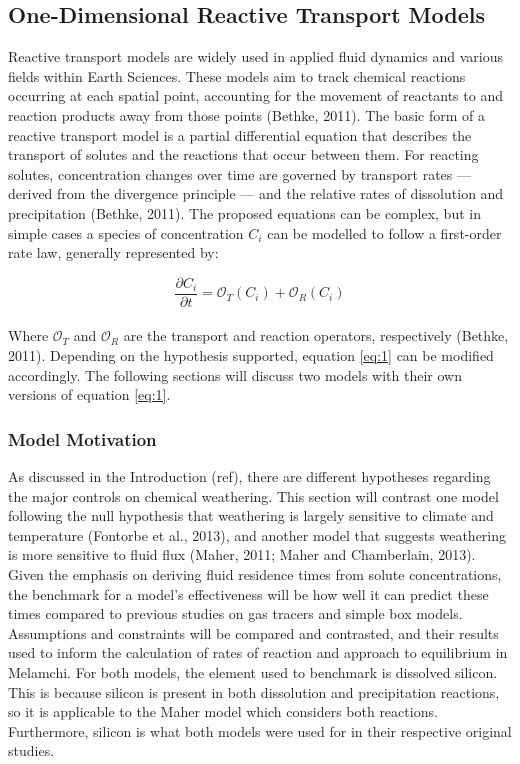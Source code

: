 \subsection{One-Dimensional Reactive Transport Models}

Reactive transport models are widely used in applied fluid dynamics and various fields within Earth Sciences. These models aim to track chemical reactions occurring at each spatial point, accounting for the movement of reactants to and reaction products away from those points (Bethke, 2011). The basic form of a reactive transport model is a partial differential equation that describes the transport of solutes and the reactions that occur between them. For reacting solutes, concentration changes over time are governed by transport rates — derived from the divergence principle — and the relative rates of dissolution and precipitation (Bethke, 2011). The proposed equations can be complex, but in simple cases a species of concentration $C_i$ can be modelled to follow a first-order rate law, generally represented by:

\begin{equation}
    \frac{\partial C_i}{\partial t} = \mathcal{O}_{T}(C_i) + \mathcal{O}_{R}(C_i)
    \label{eq:1}
\end{equation}\\


Where \(\mathcal{O}_{T}\) and \(\mathcal{O}_{R}\) are the transport and reaction operators, respectively (Bethke, 2011). Depending on the hypothesis supported, equation \ref{eq:1} can be modified accordingly. The following sections will discuss two models with their own versions of equation \ref{eq:1}.





\subsubsection*{Model Motivation}

As discussed in the Introduction (ref), there are different hypotheses regarding the major controls on chemical weathering. This section will contrast one model following the null hypothesis that weathering is largely sensitive to climate and temperature (Fontorbe et al., 2013), and another model that suggests weathering is more sensitive to fluid flux (Maher, 2011; Maher and Chamberlain, 2013). Given the emphasis on deriving fluid residence times from solute concentrations, the benchmark for a model's effectiveness will be how well it can predict these times compared to previous studies on gas tracers and simple box models. Assumptions and constraints will be compared and contrasted, and their results used to inform the calculation of rates of reaction and approach to equilibrium in Melamchi. For both models, the element used to benchmark is dissolved silicon. This is because silicon is present in both dissolution and precipitation reactions, so it is applicable to the Maher model which considers both reactions. Furthermore, silicon is what both models were used for in their respective original studies.

